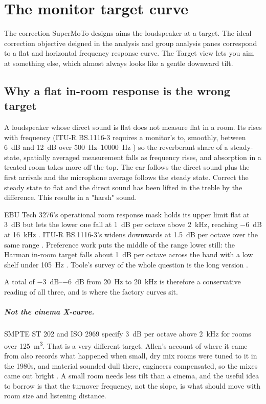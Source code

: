 \chapter{The monitor target curve}\label{ch:target}

The correction SuperMoTo designs aims the loudspeaker at a target. The ideal correction objective deigned in the analysis and group analysis panes correspond to a flat and horizontal frequency response curve. The Target view lets you aim at something else, which almost always looks like a gentle downward tilt.

\section{Why a flat in-room response is the wrong target}\label{sec:whytilt}
A loudspeaker whose direct sound is flat does not measure flat in a room. Its  rises with frequency (ITU-R BS.1116-3 requires a monitor's to, smoothly, between \SI{6}{\dB} and \SI{12}{\dB} over \SIrange{500}{10000}{\hertz} \cite{ITU1116}) so the reverberant share of a steady-state, spatially averaged measurement falls as frequency rises, and absorption in a treated room takes more off the top. The ear follows the direct sound plus the first arrivals and the microphone average follows the steady state. Correct the steady state to flat and the direct sound has been lifted in the treble by the difference. This results in a "harsh" sound.

EBU Tech 3276's operational room response mask holds its upper limit flat at \SI{+3}{\dB} but lets the lower one fall at \SI{1}{\dB} per octave above \SI{2}{\kilo\hertz}, reaching \SI{-6}{\dB} at \SI{16}{\kilo\hertz} \cite{EBU3276}. ITU-R BS.1116-3's widens downwards at \SI{1.5}{\dB} per octave over the same range \cite{ITU1116}. Preference work puts the middle of the range lower still: the Harman in-room target falls about \SI{1}{\dB} per octave across the band with a low shelf under \SI{105}{\hertz} \cite{Olive2013}. Toole's survey of the whole question is the long version \cite{Toole2015}.

A total of \SIrange{-3}{-6}{\dB} from \SI{20}{\hertz} to \SI{20}{\kilo\hertz} is therefore a conservative reading of all three, and is where the factory curves sit.

\paragraph{Not the cinema X-curve.} SMPTE ST 202 and ISO 2969 specify \SI{3}{\dB} per octave above \SI{2}{\kilo\hertz} for rooms over \SI{125}{\cubic\metre}. That is a very different target. Allen's account of where it came from also records what happened when small, dry mix rooms were tuned to it in the 1980s, and material sounded dull there, engineers compensated, so the mixes came out bright \cite{Allen2006}. A small room needs less tilt than a cinema, and the useful idea to borrow is that the turnover frequency, not the slope, is what should move with room size and listening distance.

